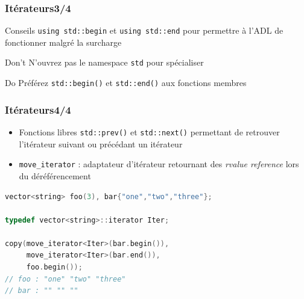 \documentclass[C++.tex]{subfiles}
\begin{document}
\begin{frame}[fragile]
	\frametitle{Itérateurs\titlehfill{}3/4}
	\begin{block}{Conseils}
		\lstinline|using std::begin| et \lstinline|using std::end| pour permettre à l'ADL de fonctionner malgré la surcharge
	\end{block}

	\begin{alertblock}{Don't}
		N'ouvrez pas le namespace \lstinline|std| pour spécialiser
	\end{alertblock}

	\begin{exampleblock}{Do}
		Préférez \lstinline|std::begin()| et \lstinline|std::end()| aux fonctions membres

	\end{exampleblock}
\end{frame}

\begin{frame}[fragile]
	\frametitle{Itérateurs\titlehfill{}4/4}
	\begin{itemize}
		\item Fonctions libres \lstinline|std::prev()| et \lstinline|std::next()| permettant de retrouver l'itérateur suivant ou précédant un itérateur
		\item \lstinline|move_iterator| : adaptateur d'itérateur retournant des \textit{rvalue reference} lors du déréférencement
	\end{itemize}

	\begin{lstlisting}[language=C++]
vector<string> foo(3), bar{"one","two","three"};

typedef vector<string>::iterator Iter;

copy(move_iterator<Iter>(bar.begin()),
     move_iterator<Iter>(bar.end()),
     foo.begin());
// foo : "one" "two" "three"
// bar : "" "" ""\end{lstlisting}

\end{frame}
\end{document}
